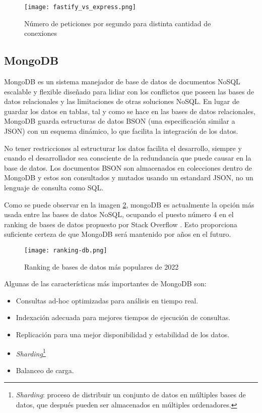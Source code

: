 \begin{figure}[H]
    \centering
    \texttt{[image: fastify\_vs\_express.png]}
    \caption{ Número de peticiones por segundo para distinta cantidad de conexiones}
    \label{fig:fastify_vs_express}
\end{figure}

\subsection{MongoDB}

MongoDB es un sistema manejador de base de datos de documentos NoSQL escalable y flexible diseñado para lidiar con los conflictos que poseen las bases de datos relacionales y las limitaciones de otras soluciones NoSQL. En lugar de guardar los datos en tablas, tal y como se hace en las bases de datos relacionales, MongoDB guarda estructuras de datos BSON (una especificación similar a JSON) con un esquema dinámico, lo que facilita la integración de los datos.

No tener restricciones al estructurar los datos facilita el desarrollo, siempre y cuando el desarrollador sea consciente de la redundancia que puede causar en la base de datos. Los documentos BSON son almacenados en colecciones dentro de MongoDB y estos son consultados y mutados usando un estandard JSON, no un lenguaje de consulta como SQL.

Como se puede observar en la imagen \ref{fig:ranking-db}, mongoDB es actualmente la opción más usada entre las bases de datos NoSQL, ocupando el puesto número 4 en el ranking de bases de datos propuesto por Stack Overflow \cite{StackOverflowSurvey}. Esto proporciona suficiente certeza de que MongoDB será mantenido por años en el futuro.

\begin{figure}[H]
    \centering
    \texttt{[image: ranking-db.png]}
    \caption{Ranking de bases de datos más populares de 2022}
    \label{fig:ranking-db}
\end{figure}

Algunas de las características más importantes de MongoDB son:

\begin{itemize}
  \item Consultas ad-hoc optimizadas para análisis en tiempo real.
  \item Indexación adecuada para mejores tiempos de ejecución de consultas.
  \item Replicación para una mejor disponibilidad y estabilidad de los datos.
  \item \textit{Sharding}\footnote{\textit{Sharding}: proceso de distribuir un conjunto de datos en múltiples bases de datos, que después pueden ser almacenados en múltiples ordenadores.}
  \item Balanceo de carga.
\end{itemize}


